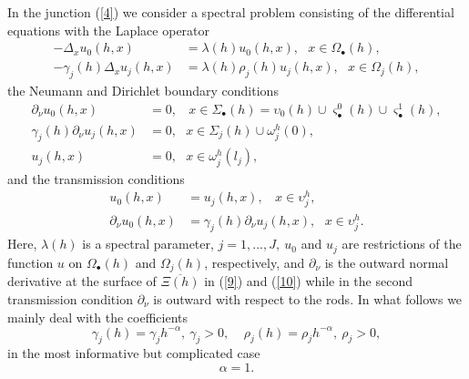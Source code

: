 \documentclass[11pt]{article}%
\numberwithin{equation}{section}
\begin{document}
In the junction (\ref{4}) we consider a spectral problem consisting of the
differential equations with the Laplace operator%
\begin{align}
-\Delta_{x}u_{0}\left(  h,x\right)   &  =\lambda(h)u_{0}\left(  h,x\right)
,\ \ \ x\in\Omega_{\bullet}\left(  h\right)  ,\label{7}\\
-\gamma_{j}\left(  h\right)  \Delta_{x}u_{j}\left(  h,x\right)   &
=\lambda(h)\rho_{j}(h)u_{j}\left(  h,x\right)  ,\ \ \ x\in\Omega_{j}\left(
h\right)  , \label{8}%
\end{align}
the Neumann and Dirichlet boundary conditions%
\begin{align}
\partial_{\nu}u_{0}\left(  h,x\right)   &  =0,\ \ \ \ x\in\Sigma_{\bullet
}\left(  h\right)  =\mathbb{\upsilon}_{0}\left(  h\right)  \cup\varsigma
_{\bullet}^{0}\left(  h\right)  \cup\varsigma_{\bullet}^{1}\left(  h\right)
,\label{9}\\
\gamma_{j}\left(  h\right)  \partial_{\nu}u_{j}\left(  h,x\right)   &
=0,\ \ \ x\in\Sigma_{j}\left(  h\right)  \cup\mathbb{\omega}_{j}^{h}\left(
0\right)  ,\label{10}\\
u_{j}\left(  h,x\right)   &  =0,\ \ \ x\in\mathbb{\omega}_{j}^{h}\left(
l_{j}\right)  , \label{11}%
\end{align}
and the transmission conditions%
\begin{align}
u_{0}\left(  h,x\right)   &  =u_{j}\left(  h,x\right)  ,\ \ \ \ x\in
\mathbb{\upsilon}_{j}^{h},\label{12}\\
\partial_{\nu}u_{0}\left(  h,x\right)   &  =\gamma_{j}\left(  h\right)
\partial_{\nu}u_{j}\left(  h,x\right)  ,\ \ \ x\in\mathbb{\upsilon}_{j}^{h}.
\label{13}%
\end{align}
Here, $\lambda(h)$ is a spectral parameter, $j=1,...,J,\ u_{0}$ and $u_{j}$
are restrictions of the function $u$ on $\Omega_{\bullet}\left(  h\right)  $
and $\Omega_{j}\left(  h\right)  $, respectively, and $\partial_{\nu}$ is the
outward normal derivative at the surface of $\overline{\Xi(h)}$ in (\ref{9})
and (\ref{10}) while in the second transmission condition $\partial_{\nu}$ is
outward with respect to the rods. In what follows we mainly deal with the
coefficients%
\begin{equation}
\gamma_{j}\left(  h\right)  =\gamma_{j}h^{-\alpha},\ \gamma_{j}%
>0,\ \ \ \ \ \rho_{j}\left(  h\right)  =\rho_{j}h^{-\alpha},\ \rho_{j}>0,
\label{14}%
\end{equation}
in the most informative but complicated case%
\begin{equation}
\alpha=1. \label{15}%
\end{equation}
\end{document}
